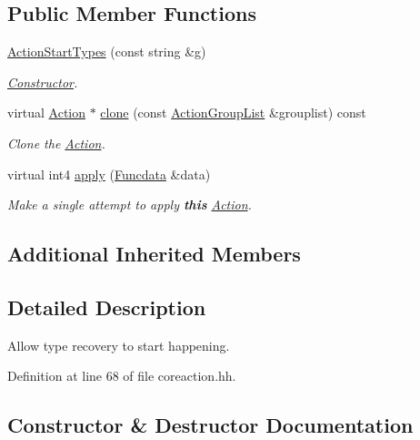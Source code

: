 \subsection*{Public Member Functions}
\begin{DoxyCompactItemize}
\item 
\mbox{\hyperlink{class_action_start_types_a369a28fa31bbb8aafc9d8db2b1ac5d8a}{Action\+Start\+Types}} (const string \&g)
\begin{DoxyCompactList}\small\item\em \mbox{\hyperlink{class_constructor}{Constructor}}. \end{DoxyCompactList}\item 
virtual \mbox{\hyperlink{class_action}{Action}} $\ast$ \mbox{\hyperlink{class_action_start_types_a6779f5bf6578c6318c2a9cc5d7648d0f}{clone}} (const \mbox{\hyperlink{class_action_group_list}{Action\+Group\+List}} \&grouplist) const
\begin{DoxyCompactList}\small\item\em Clone the \mbox{\hyperlink{class_action}{Action}}. \end{DoxyCompactList}\item 
virtual int4 \mbox{\hyperlink{class_action_start_types_a14215a512844751f3199f318f60add40}{apply}} (\mbox{\hyperlink{class_funcdata}{Funcdata}} \&data)
\begin{DoxyCompactList}\small\item\em Make a single attempt to apply {\bfseries{this}} \mbox{\hyperlink{class_action}{Action}}. \end{DoxyCompactList}\end{DoxyCompactItemize}
\subsection*{Additional Inherited Members}


\subsection{Detailed Description}
Allow type recovery to start happening. 

Definition at line 68 of file coreaction.\+hh.



\subsection{Constructor \& Destructor Documentation}
\mbox{\label{class_action_start_types_a369a28fa31bbb8aafc9d8db2b1ac5d8a}} 
